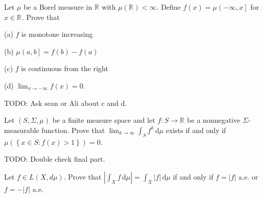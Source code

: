 
\begin{problem}{1}
  Let $\mu$ be a Borel measure in $\mathbb{R}^{}$ with $\mu\left( \mathbb{R}^{} \right) < \infty$.
  Define $f\left( x \right) = \mu\left( - \infty, x  \right]$ for $x \in \mathbb{R}^{}$.
  Prove that

  (a) $f$ is monotone increasing

  (b) $\mu \left( a,b \right] = f\left( b \right) - f\left( a \right)$

  (c) $f$ is continuous from the right

  (d) $\lim_{x \to -\infty} f\left( x  \right) = 0$.
\end{problem}

\begin{solution}
  TODO: Ask sean or Ali about c and d.
\end{solution}

\pagebreak

\begin{problem}{2}
  Let $\left( S, \Sigma, \mu \right)$ be a finite measure space and let $f : S \to \mathbb{R}^{} $ be a nonnegative $\Sigma$-measurable function.
  Prove that $\lim_{k \to \infty} \int_{S} \! f^{k} \, \mathrm{d}\mu $ exists if and only if \\
  $\mu\left( \left\{ x \in S : f(x) > 1 \right\} \right) = 0$.
\end{problem}
    
\begin{solution}
  TODO: Double check final part.
\end{solution}

\pagebreak

\begin{problem}{3}
  Let $f \in L\left( X,d \mu \right)$. Prove that $\left| \int_{X} \! f \, \mathrm{d}\mu  \right| = \int_{X} \! \left| f \right| \, \mathrm{d}\mu $ if and only if $f = \left| f \right|$ a.e. or $f = - \left| f \right|$ a.e.
\end{problem}

